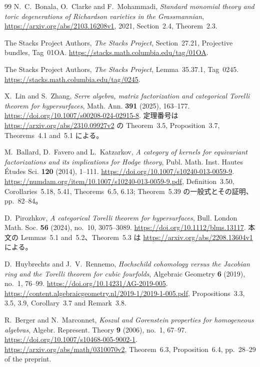 \begin{thebibliography}{99}
N.~C.~Bonala, O.~Clarke and F.~Mohammadi,
\emph{Standard monomial theory and toric degenerations of Richardson varieties in the Grassmannian},
\url{https://arxiv.org/abs/2103.16208v1}, 2021,
Section~2.4, Theorem~2.3.

The Stacks Project Authors,
\emph{The Stacks Project}, Section~27.21, Projective bundles, Tag~01OA.
\url{https://stacks.math.columbia.edu/tag/01OA}.

The Stacks Project Authors,
\emph{The Stacks Project}, Lemma~35.37.1, Tag~0245.
\url{https://stacks.math.columbia.edu/tag/0245}.

X.~Lin and S.~Zhang,
\emph{Serre algebra, matrix factorization and categorical Torelli theorem for hypersurfaces},
Math. Ann. \textbf{391} (2025), 163--177.
\url{https://doi.org/10.1007/s00208-024-02915-8}.
定理番号は \url{https://arxiv.org/abs/2310.09927v2}
の Theorem~3.5, Proposition~3.7, Theorems~4.1 and~5.1 による。

M.~Ballard, D.~Favero and L.~Katzarkov,
\emph{A category of kernels for equivariant factorizations and its implications for Hodge theory},
Publ. Math. Inst. Hautes \'Etudes Sci. \textbf{120} (2014), 1--111.
\url{https://doi.org/10.1007/s10240-013-0059-9}.
\url{https://numdam.org/item/10.1007/s10240-013-0059-9.pdf},
Definition~3.50, Corollaries~5.18, 5.41, Theorems~6.5, 6.13;
Theorem~5.39 の一般式とその証明、pp.~82--84。

D.~Pirozhkov,
\emph{A categorical Torelli theorem for hypersurfaces},
Bull. London Math. Soc. \textbf{56} (2024), no.~10, 3075--3089.
\url{https://doi.org/10.1112/blms.13117}.
本文の Lemmas~5.1 and~5.2、Theorem~5.3 は
\url{https://arxiv.org/abs/2208.13604v1} による。

D.~Huybrechts and J.~V.~Rennemo,
\emph{Hochschild cohomology versus the Jacobian ring and the Torelli theorem for cubic fourfolds},
Algebraic Geometry \textbf{6} (2019), no.~1, 76--99.
\url{https://doi.org/10.14231/AG-2019-005}.
\url{https://content.algebraicgeometry.nl/2019-1/2019-1-005.pdf},
Propositions~3.3, 3.5, 3.9, Corollary~3.7 and Remark~3.8.

R.~Berger and N.~Marconnet,
\emph{Koszul and Gorenstein properties for homogeneous algebras},
Algebr. Represent. Theory \textbf{9} (2006), no.~1, 67--97.
\url{https://doi.org/10.1007/s10468-005-9002-1}.
\url{https://arxiv.org/abs/math/0310070v2},
Theorem~6.3, Proposition~6.4, pp.~28--29 of the preprint.


\end{thebibliography}
